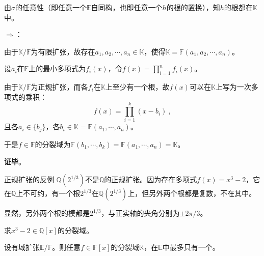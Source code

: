 由$\sigma$的任意性（即任意一个$\mathbb{E}$自同构，也即任意一个$h$的根的置换），知$h$的根都在$\mathbb{K}$中。



$\Rightarrow$：

由于$\mathbb{K}/\mathbb{F}$为有限扩张，故存在$a_1, a_2, \cdots, a_n\in \mathbb{K}$，使得$\mathbb{K}=\mathbb{F}(a_1, a_2, \cdots, a_n)$。

设$a_i$在$\mathbb{F}$上的最小多项式为$f_i(x)$，令$f(x)=\prod_{i=1}^n f_i(x)$。

由于$\mathbb{K}/\mathbb{F}$为正规扩张，而各$f_i$在$\mathbb{K}$上至少有一个根，故$f(x)$可以在$\mathbb{K}$上写为一次多项式的乘积：
\begin{equation}
f(x) = \prod_{i=1}^k (x-b_i)~,
\end{equation}
且各$a_i\in\{b_j\}$，各$b_i\in\mathbb{K}=\mathbb{F}(a_1, \cdots, a_n)$。

于是$f\in\mathbb{F}$的分裂域为$\mathbb{F}(b_1, \cdots, b_k)=\mathbb{F}(a_1, \cdots, a_n)=\mathbb{K}$。

\textbf{证毕}。








\begin{example}{正规扩张的反例}
$\mathbb{Q}(2^{1/3})$不是$\mathbb{Q}$的正规扩张。因为存在多项式$f(x)=x^3-2$，它在$\mathbb{Q}$上不可约，有一个根$2^{1/3}$在$\mathbb{Q}(2^{1/3})$上，但另外两个根都是复数，不在其中。

显然，另外两个根的模都是$2^{1/3}$，与正实轴的夹角分别为$\pm 2\pi/3$。
\end{example}

\begin{exercise}{}
求$x^3-2\in\mathbb{Q}[x]$的分裂域。
\end{exercise}



\begin{corollary}{}
设有域扩张$\mathbb{E}/\mathbb{F}$。则任意$f\in\mathbb{F}[x]$的分裂域$\mathbb{K}$，在$\mathbb{E}$中最多只有一个。
\end{corollary}









